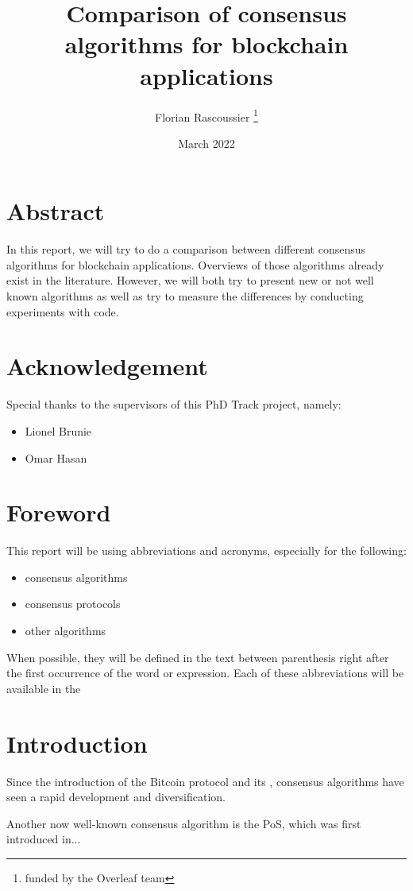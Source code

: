 \documentclass[12pt]{article} %
\title{Comparison of consensus algorithms for blockchain applications}
\author{Florian Rascoussier \thanks{funded by the Overleaf team}}
\date{March 2022}
\begin{document}

\newpage


\newpage

\section{Abstract}
In this report, we will try to do a comparison between different consensus 
algorithms for blockchain applications. Overviews of those algorithms 
already exist in the literature. However, we will both try to present
new or not well known algorithms as well as try to measure the 
differences by conducting experiments with code.

\section{Acknowledgement}
Special thanks to the supervisors of this PhD Track project, namely:
\begin{itemize}
    \item Lionel Brunie
    \item Omar Hasan
\end{itemize}

\section{Foreword}
This report will be using abbreviations and acronyms, especially for the following:
\begin{itemize}
    \item consensus algorithms
    \item consensus protocols
    \item other algorithms
\end{itemize}
When possible, they will be defined in the text between parenthesis right after 
the first occurrence of the word or expression. Each of these abbreviations will 
be available in the 

\newpage
\tableofcontents

\newpage
{} %

\section{Introduction}
Since the introduction of the Bitcoin protocol and its 
 \cite{Nakamoto2009-uw}, consensus algorithms have 
seen a rapid development and diversification. 

Another now well-known consensus algorithm is the \acrlong{PoS}, which
was first introduced in...
\end{document}
